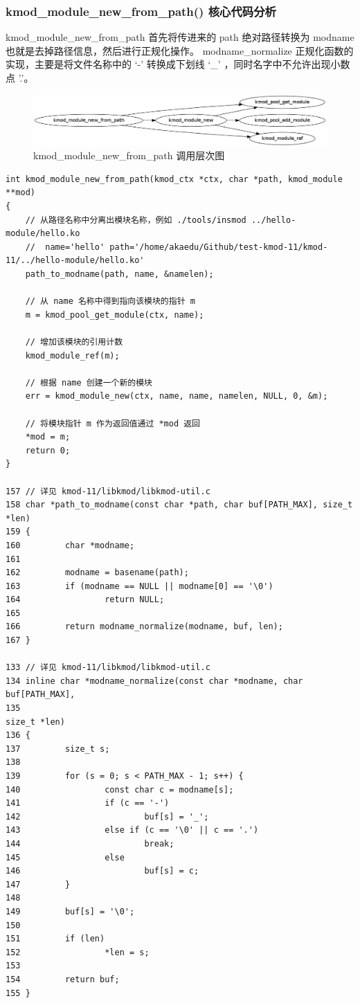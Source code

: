 \documentclass[11pt,a4paper]{article}
\makeatletter
\def\maxwidth{\ifdim\Gin@nat@width>\linewidth\linewidth
\else\Gin@nat@width\fi}
\let\Oldincludegraphics\includegraphics
\renewcommand{\includegraphics}[1]{\Oldincludegraphics[width=\maxwidth]{#1}}
\makeatother
\begin{document}
\subsubsection{kmod\_module\_new\_from\_path() 核心代码分析}

kmod\_module\_new\_from\_path 首先将传进来的 path 绝对路径转换为 modname
也就是去掉路径信息，然后进行正规化操作。 modname\_normalize
正规化函数的实现，主要是将文件名称中的 `-' 转换成下划线 `\_'
，同时名字中不允许出现小数点 '.'。

\begin{figure}[htbp]
\centering
\includegraphics{./figures/kmod_module_new_from_path.jpg}
\caption{kmod\_module\_new\_from\_path 调用层次图}
\end{figure}

{\begin{shaded}\begin{verbatim}
int kmod_module_new_from_path(kmod_ctx *ctx, char *path, kmod_module **mod)
{
    // 从路径名称中分离出模块名称，例如 ./tools/insmod ../hello-module/hello.ko
    //  name='hello' path='/home/akaedu/Github/test-kmod-11/kmod-11/../hello-module/hello.ko'
    path_to_modname(path, name, &namelen);

    // 从 name 名称中得到指向该模块的指针 m
    m = kmod_pool_get_module(ctx, name);

    // 增加该模块的引用计数
    kmod_module_ref(m);

    // 根据 name 创建一个新的模块
    err = kmod_module_new(ctx, name, name, namelen, NULL, 0, &m); 

    // 将模块指针 m 作为返回值通过 *mod 返回
    *mod = m;
    return 0;
}

157 // 详见 kmod-11/libkmod/libkmod-util.c 
158 char *path_to_modname(const char *path, char buf[PATH_MAX], size_t *len)
159 {
160         char *modname;
161 
162         modname = basename(path);
163         if (modname == NULL || modname[0] == '\0')
164                 return NULL;
165 
166         return modname_normalize(modname, buf, len);
167 }

133 // 详见 kmod-11/libkmod/libkmod-util.c 
134 inline char *modname_normalize(const char *modname, char buf[PATH_MAX],
135                                                                 size_t *len)
136 {
137         size_t s;
138 
139         for (s = 0; s < PATH_MAX - 1; s++) {
140                 const char c = modname[s];
141                 if (c == '-')
142                         buf[s] = '_';
143                 else if (c == '\0' || c == '.')
144                         break;
145                 else
146                         buf[s] = c;
147         }
148 
149         buf[s] = '\0';
150 
151         if (len)
152                 *len = s;
153 
154         return buf;
155 }
\end{verbatim}\end{shaded}}
\end{document}
